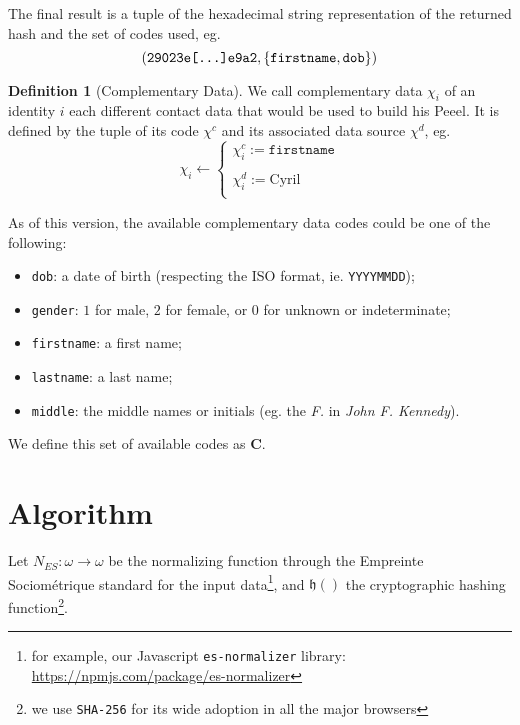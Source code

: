 \documentclass[twoside,twocolumn]{article}
\theoremstyle{definition}
\newtheorem{definition}{Definition}
\theoremstyle{remark}
\begin{document}
The final result is a tuple of the hexadecimal string representation of the returned hash and the set of codes used,
eg. $$(\texttt{29023e[\dots]e9a2}, \{ \texttt{firstname}, \texttt{dob} \})$$

\begin{definition}[Complementary Data]
    \label{complementaryData}
    We call complementary data $\chi_i$ of an identity $i$ each different contact data that would be used to build his Peeel.
    It is defined by the tuple of its code $\chi^c$ and its associated data source $\chi^d$, eg.$$
        \chi_i \gets \left\{
            \begin{array}{l}
                \chi_i^c := \texttt{firstname} \\ \\
                \chi_i^d := \textrm{Cyril} \\
            \end{array}
        \right.
    $$

    As of this version, the available complementary data codes could be one of the following:
    \begin{itemize}
        \item \texttt{dob}: a date of birth (respecting the ISO format, ie. \texttt{YYYYMMDD});
        \item \texttt{gender}: $1$ for male, $2$ for female, or $0$ for unknown or indeterminate;
        \item \texttt{firstname}: a first name;
        \item \texttt{lastname}: a last name;
        \item \texttt{middle}: the middle names or initials (eg. the \emph{F.} in \emph{John F. Kennedy}).
    \end{itemize}

    We define this set of available codes as $\mathcal{\textbf{C}}$.
\end{definition}


\section{Algorithm}

Let $N_{ES}: \omega \to \omega$ be the normalizing function through the Empreinte Sociométrique standard for the input data\footnote{for example, our 
Javascript \texttt{es-normalizer} library: \small\url{https://npmjs.com/package/es-normalizer}}, and $\mathfrak{h}()$ the cryptographic hashing 
function\footnote{we use \texttt{SHA-256} for its wide adoption in all the major browsers}.
\end{document}
